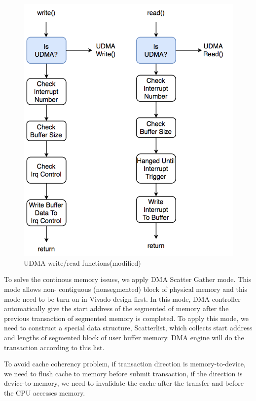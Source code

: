 \begin{figure}[!htb]
  \centering
  \includegraphics[scale=0.5]{images/udma_func_entry.png}
  \caption[UDMA write/read functions(modified)]{UDMA write/read functions(modified)}
  \label{fig:UDMA write and read functions(modified)}
\end{figure}



To solve the continous memory issues, we apply DMA Scatter Gather mode. This mode allows non-
contiguous (nonsegmented) block of physical memory and this mode need to be turn on in Vivado 
design first. In this mode, DMA controller automatically give the start address of the 
segmented of memory after the previous transaction of segmented memory is completed. To 
apply this mode, we need to construct a special data structure, Scatterlist, which collects 
start address and lengths of segmented block of user buffer memory. DMA engine will do the
transaction according to this list. 

To avoid cache coherency problem, if transaction direction is memory-to-device, we need to flush 
cache to memory before submit transaction, if the direction is device-to-memory, we need to invalidate 
the cache after the transfer and before the CPU accesses memory. 







